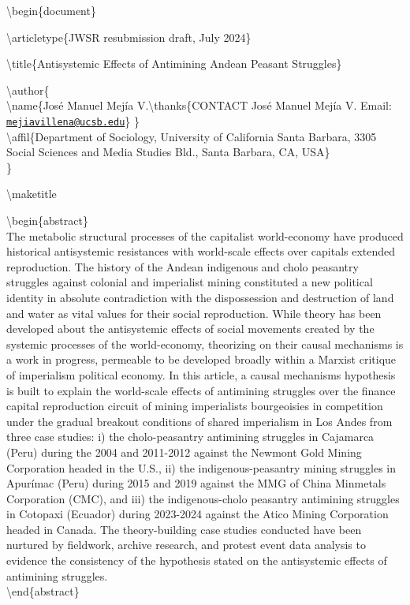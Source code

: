 \documentclass[
]{article}
\begin{document}
\textbackslash begin\{document\}

\textbackslash articletype\{JWSR resubmission draft, July 2024\}

\textbackslash title\{Antisystemic Effects of Antimining Andean Peasant
Struggles\}

\textbackslash author\{\\
\textbackslash name\{José Manuel Mejía V.\textbackslash thanks\{CONTACT
José Manuel Mejía V. Email:
\href{mailto:mejiavillena@ucsb.edu}{\nolinkurl{mejiavillena@ucsb.edu}}\}
\}\\
\textbackslash affil\{Department of Sociology, University of California
Santa Barbara, 3305 Social Sciences and Media Studies Bld., Santa
Barbara, CA, USA\}\\
\}

\textbackslash maketitle

\textbackslash begin\{abstract\}\\
The metabolic structural processes of the capitalist world-economy have
produced historical antisystemic resistances with world-scale effects
over capital\textquotesingle s extended reproduction. The history of the
Andean indigenous and cholo peasantry struggles against colonial and
imperialist mining constituted a new political identity in absolute
contradiction with the dispossession and destruction of land and water
as vital values for their social reproduction. While theory has been
developed about the antisystemic effects of social movements created by
the systemic processes of the world-economy, theorizing on their causal
mechanisms is a work in progress, permeable to be developed broadly
within a Marxist critique of imperialism political economy. In this
article, a causal mechanisms hypothesis is built to explain the
world-scale effects of antimining struggles over the finance capital
reproduction circuit of mining imperialists bourgeoisies in competition
under the gradual breakout conditions of shared imperialism in Los Andes
from three case studies: i) the cholo-peasantry antimining struggles in
Cajamarca (Peru) during the 2004 and 2011-2012 against the Newmont Gold
Mining Corporation headed in the U.S., ii) the indigenous-peasantry
mining struggles in Apurímac (Peru) during 2015 and 2019 against the MMG
of China Minmetals Corporation (CMC), and iii) the indigenous-cholo
peasantry antimining struggles in Cotopaxi (Ecuador) during 2023-2024
against the Atico Mining Corporation headed in Canada. The
theory-building case studies conducted have been nurtured by fieldwork,
archive research, and protest event data analysis to evidence the
consistency of the hypothesis stated on the antisystemic effects of
antimining struggles.\\
\textbackslash end\{abstract\}
\end{document}

